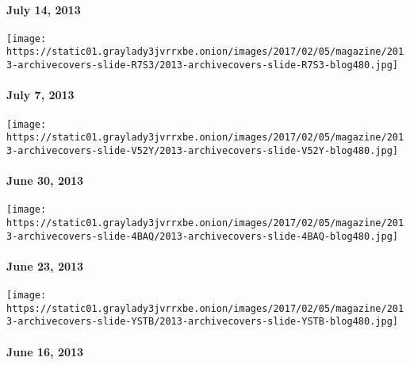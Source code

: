 \hypertarget{july-14-2013}{%
\paragraph{July 14, 2013}\label{july-14-2013}}

\href{http://www.nytimes3xbfgragh.onion/indexes/2013/07/07/magazine/index.html}{}

\texttt{[image: https://static01.graylady3jvrrxbe.onion/images/2017/02/05/magazine/2013-archivecovers-slide-R7S3/2013-archivecovers-slide-R7S3-blog480.jpg]}

\hypertarget{july-7-2013}{%
\paragraph{July 7, 2013}\label{july-7-2013}}

\href{http://www.nytimes3xbfgragh.onion/indexes/2013/06/30/magazine/index.html}{}

\texttt{[image: https://static01.graylady3jvrrxbe.onion/images/2017/02/05/magazine/2013-archivecovers-slide-V52Y/2013-archivecovers-slide-V52Y-blog480.jpg]}

\hypertarget{june-30-2013}{%
\paragraph{June 30, 2013}\label{june-30-2013}}

\href{http://www.nytimes3xbfgragh.onion/indexes/2013/06/23/magazine/index.html}{}

\texttt{[image: https://static01.graylady3jvrrxbe.onion/images/2017/02/05/magazine/2013-archivecovers-slide-4BAQ/2013-archivecovers-slide-4BAQ-blog480.jpg]}

\hypertarget{june-23-2013}{%
\paragraph{June 23, 2013}\label{june-23-2013}}

\href{http://www.nytimes3xbfgragh.onion/indexes/2013/06/16/magazine/index.html}{}

\texttt{[image: https://static01.graylady3jvrrxbe.onion/images/2017/02/05/magazine/2013-archivecovers-slide-YSTB/2013-archivecovers-slide-YSTB-blog480.jpg]}

\hypertarget{june-16-2013}{%
\paragraph{June 16, 2013}\label{june-16-2013}}

